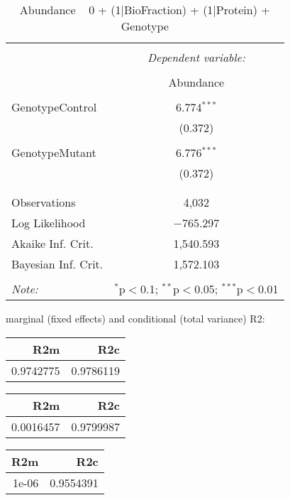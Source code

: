 \documentclass[11pt]{report}
\begin{document}
\begin{table}[!htbp] \centering 
  \caption{Abundance ~ 0 + (1|BioFraction) + (1|Protein) + Genotype} 
  \label{} 
\begin{tabular}{@{\extracolsep{5pt}}lc} 
\\[-1.8ex]\hline 
\hline \\[-1.8ex] 
 & \multicolumn{1}{c}{\textit{Dependent variable:}} \\ 
\cline{2-2} 
\\[-1.8ex] & Abundance \\ 
\hline \\[-1.8ex] 
 GenotypeControl & 6.774$^{***}$ \\ 
  & (0.372) \\ 
  & \\ 
 GenotypeMutant & 6.776$^{***}$ \\ 
  & (0.372) \\ 
  & \\ 
\hline \\[-1.8ex] 
Observations & 4,032 \\ 
Log Likelihood & $-$765.297 \\ 
Akaike Inf. Crit. & 1,540.593 \\ 
Bayesian Inf. Crit. & 1,572.103 \\ 
\hline 
\hline \\[-1.8ex] 
\textit{Note:}  & \multicolumn{1}{r}{$^{*}$p$<$0.1; $^{**}$p$<$0.05; $^{***}$p$<$0.01} \\ 
\end{tabular} 
\end{table} 
marginal (fixed effects) and conditional (total variance) R2:

\begin{tabular}{r|r}
\hline
R2m & R2c\\
\hline
0.9742775 & 0.9786119\\
\hline
\end{tabular}

\begin{tabular}{r|r}
\hline
R2m & R2c\\
\hline
0.0016457 & 0.9799987\\
\hline
\end{tabular}

\begin{tabular}{r|r}
\hline
R2m & R2c\\
\hline
1e-06 & 0.9554391\\
\hline
\end{tabular}
\end{document}
